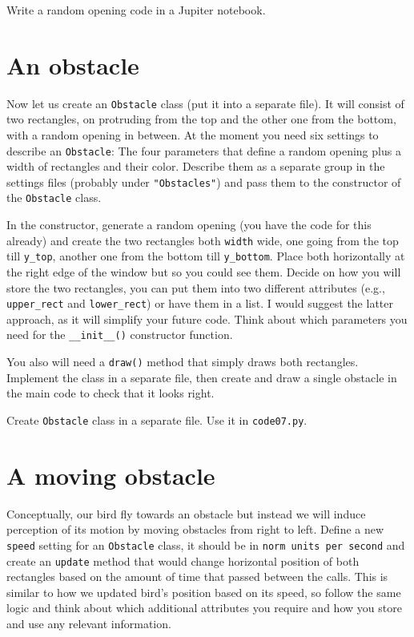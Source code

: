 \documentclass[
]{book}
\begin{document}
Write a random opening code in a Jupiter notebook.

\hypertarget{an-obstacle}{%
\section{An obstacle}\label{an-obstacle}}

Now let us create an \texttt{Obstacle} class (put it into a separate file). It will consist of two rectangles, on protruding from the top and the other one from the bottom, with a random opening in between. At the moment you need six settings to describe an \texttt{Obstacle}: The four parameters that define a random opening plus a width of rectangles and their color. Describe them as a separate group in the settings files (probably under \texttt{"Obstacles"}) and pass them to the constructor of the \texttt{Obstacle} class.

In the constructor, generate a random opening (you have the code for this already) and create the two rectangles both \texttt{width} wide, one going from the top till \texttt{y\_top}, another one from the bottom till \texttt{y\_bottom}. Place both horizontally at the right edge of the window but so you could see them. Decide on how you will store the two rectangles, you can put them into two different attributes (e.g., \texttt{upper\_rect} and \texttt{lower\_rect}) or have them in a list. I would suggest the latter approach, as it will simplify your future code. Think about which parameters you need for the \texttt{\_\_init\_\_()} constructor function.

You also will need a \texttt{draw()} method that simply draws both rectangles. Implement the class in a separate file, then create and draw a single obstacle in the main code to check that it looks right.

Create \texttt{Obstacle} class in a separate file.
Use it in \texttt{code07.py}.

\hypertarget{a-moving-obstacle}{%
\section{A moving obstacle}\label{a-moving-obstacle}}

Conceptually, our bird fly towards an obstacle but instead we will induce perception of its motion by moving obstacles from right to left. Define a new \texttt{speed} setting for an \texttt{Obstacle} class, it should be in \texttt{norm\ units\ per\ second} and create an \texttt{update} method that would change horizontal position of both rectangles based on the amount of time that passed between the calls. This is similar to how we updated bird's position based on its speed, so follow the same logic and think about which additional attributes you require and how you store and use any relevant information.
\end{document}
